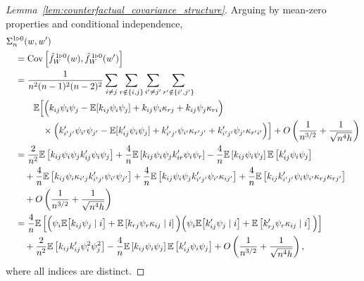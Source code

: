 \begin{proof}[Lemma~\ref{lem:counterfactual_covariance_structure}]

  Arguing by mean-zero properties and conditional independence,
  \begin{align*}
    &\Sigma_n^{1 \triangleright 0}(w,w') \\
    &\quad=
    \operatorname{Cov}\left[
      \hat f_W^{\,1 \triangleright 0}(w),
      \hat f_W^{\,1 \triangleright 0}(w')
    \right] \\
    &\quad=
    \frac{1}{n^2(n-1)^2(n-2)^2}
    \sum_{i \neq j}
    \sum_{r \notin \{i,j\}}
    \sum_{i' \neq j'}
    \sum_{r' \notin \{i',j'\}} \\
    &\quad\qquad\mathbb{E}\Big[
      \Big(
        k_{i j} \psi_i \psi_j
        - \mathbb{E}[k_{i j} \psi_i \psi_j]
        + k_{i j}\psi_i \kappa_{r j}
        + k_{i j}\psi_j \kappa_{r i}
      \Big) \\
      &\qquad\qquad\times
      \Big(
        k_{i' j'}' \psi_{i'} \psi_{j'}
        - \mathbb{E}[k_{i j}' \psi_i \psi_j]
        + k_{i' j'}'\psi_{i'} \kappa_{r' j'}
        + k_{i' j'}'\psi_{j'} \kappa_{r' i'}
      \Big)
    \Big]
    + O\left( \frac{1}{n^{3/2}} + \frac{1}{\sqrt{n^4h}} \right) \\
    &\quad=
    \frac{2}{n^2}
    \mathbb{E}\left[
      k_{i j} \psi_i \psi_j
      k_{i j}' \psi_i \psi_j
    \right]
    + \frac{4}{n}
    \mathbb{E}\left[
      k_{i j} \psi_i \psi_j
      k_{i r}' \psi_i \psi_r
    \right]
    - \frac{4}{n}
    \mathbb{E}\left[
      k_{i j} \psi_i \psi_j
    \right]
    \mathbb{E}\left[
      k_{i j}' \psi_i \psi_j
    \right] \\
    &\qquad+
    \frac{4}{n}
    \mathbb{E}\left[
      k_{i j}\psi_i \kappa_{i' j}
      k_{i' j'}' \psi_{i'} \psi_{j'}
    \right]
    + \frac{4}{n}
    \mathbb{E}\left[
      k_{i j} \psi_{i} \psi_{j}
      k_{i' j'}'\psi_{i'} \kappa_{i j'}
    \right]
    + \frac{4}{n}
    \mathbb{E}\left[
      k_{i j} k'_{i' j'}
      \psi_i \psi_{i'}
      \kappa_{r j} \kappa_{r j'}
    \right] \\
    &\qquad+
    O\left( \frac{1}{n^{3/2}} + \frac{1}{\sqrt{n^4h}} \right) \\
    &\quad=
    \frac{4}{n}
    \mathbb{E}\left[
      \Big(
        \psi_i
        \mathbb{E}\big[
          k_{i j} \psi_j
          \mid i
        \big]
        + \mathbb{E}\left[
          k_{r j} \psi_r \kappa_{i j}
          \mid i
        \right]
      \Big)
      \Big(
        \psi_i
        \mathbb{E}\big[
          k_{i j}' \psi_j
          \mid i
        \big]
        + \mathbb{E}\left[
          k_{r j}' \psi_r \kappa_{i j}
          \mid i
        \right]
      \Big)
    \right] \\
    &\qquad+
    \frac{2}{n^2}
    \mathbb{E}\left[
      k_{i j} k_{i j}'
      \psi_i^2 \psi_j^2
    \right]
    - \frac{4}{n}
    \mathbb{E}\left[
      k_{i j} \psi_i \psi_j
    \right]
    \mathbb{E}\left[
      k_{i j}' \psi_i \psi_j
    \right]
    + O\left( \frac{1}{n^{3/2}} + \frac{1}{\sqrt{n^4h}} \right),
  \end{align*}
  where all indices are distinct.
\end{proof}

